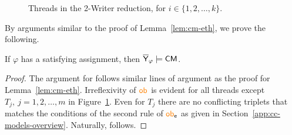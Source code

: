 \begin{figure}[t]
\caption{Threads in the 2-Writer reduction, for
$i\in\{1,2,\ldots,k\}$.}
\label{fig:cm-two-writer}
\end{figure}

By arguments similar to the proof of Lemma~\ref{lem:cm-eth}, we prove the following.

\begin{lemma}\label{lem:eth-cm}
If $\varphi$ has a satisfying assignment, then $\overline{\mathsf{\color{black}Y}}_\varphi \models \mathsf{CM}$. 
\end{lemma}
\begin{proof}
The argument for \OB{} follows similar lines of argument as the proof for Lemma~\ref{lem:cm-eth}. Irreflexivity of $\ob{}$ is evident for all threads  except $T_j,~j=1,2,\dots,m$ in Figure~\ref{fig:cm-two-writer}.  Even for $T_j$ there are no conflicting triplets that matches the conditions of the second rule of $\ob{e}$ as given in Section~\ref{app:cc-models-overview}. Naturally, \OB{} follows.
\end{proof}

